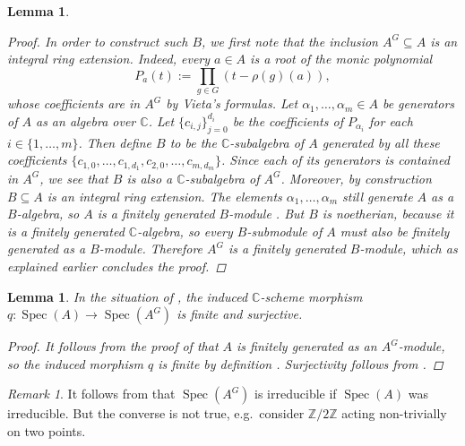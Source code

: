 \documentclass[12pt,a4paper]{amsart}
\theoremstyle{plain}
\newtheorem{lm}[thm]{Lemma}
\theoremstyle{definition}
\theoremstyle{remark}
\newtheorem{rem}[thm]{Remark}
\begin{document}
\begin{lm}
\begin{proof}
    In order to construct such $B$, we first note that the inclusion $A^{G} \subseteq A$ is an integral ring extension.
    Indeed, every $a \in A$ is a root of the monic polynomial
    \[ P_{a}(t) := \prod_{g \in G}(t - \rho(g)(a)), \]
    whose coefficients are in $A^{G}$ by Vieta's formulas.
    Let $\alpha_{1}, \ldots, \alpha_{m} \in A$ be generators of $A$ as an algebra over $\mathbb{C}$.
    Let $\{ c_{i,j} \}_{j = 0}^{d_{i}}$ be the coefficients of $P_{\alpha_{i}}$ for each $i \in \{1, \ldots, m\}$.
    Then define $B$ to be the $\mathbb{C}$-subalgebra of $A$ generated by all these coefficients $\{ c_{1,0}, \ldots, c_{1,d_{1}}, c_{2,0}, \ldots, c_{m,d_{m}} \}$.
    Since each of its generators is contained in $A^{G}$, we see that $B$ is also a $\mathbb{C}$-subalgebra of $A^{G}$.
    Moreover, by construction $B \subseteq A$ is an integral ring extension.
    The elements $\alpha_{1}, \ldots, \alpha_{m}$ still generate $A$ as a $B$-algebra, so $A$ is a finitely generated $B$-module \cite[Corollary 5.2]{am69}.
    But $B$ is noetherian, because it is a finitely generated $\mathbb{C}$-algebra, so every $B$-submodule of $A$ must also be finitely generated as a $B$-module.
    Therefore $A^{G}$ is a finitely generated $B$-module, which as explained earlier concludes the proof.
  \end{proof}

\end{lm}

\begin{lm}\label{lm:finitesurjective}
  In the situation of , the induced $\mathbb{C}$-scheme morphism $q \colon \operatorname{Spec}(A) \to \operatorname{Spec}(A^{G})$ is finite and surjective.

  \begin{proof}
    It follows from the proof of  that $A$ is finitely generated as an $A^{G}$-module, so the induced morphism $q$ is finite by definition \cite[p.~84]{har77}.
    Surjectivity follows from \cite[\href{https://stacks.math.columbia.edu/tag/00GQ}{Tag 00GQ}]{stacks-project}.
  \end{proof}
\end{lm}

\begin{rem}\label{rem:irreducible}
  It follows from  that $\operatorname{Spec}(A^{G})$ is irreducible if $\operatorname{Spec}(A)$ was irreducible.
  But the converse is not true, e.g.~consider $\mathbb{Z}/2\mathbb{Z}$ acting non-trivially on two points.
\end{rem}
\end{document}
